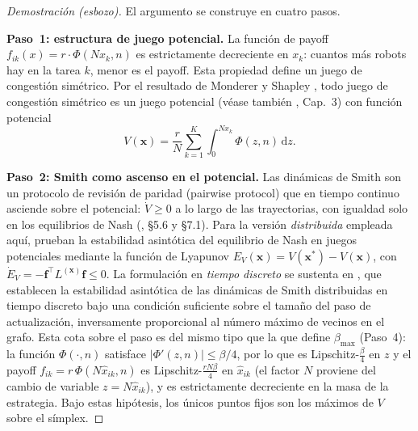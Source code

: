 \begin{proof}[Demostración (esbozo)]
El argumento se construye en cuatro pasos.

\textbf{Paso~1: estructura de juego potencial.}
La función de payoff $f_{ik}(x) = r \cdot \Phi(Nx_k, n)$ es estrictamente
decreciente en $x_k$: cuantos más robots hay en la tarea $k$, menor es el payoff.
Esta propiedad define un juego de congestión simétrico. Por el resultado de
Monderer y Shapley \citep{monderer1996potential}, todo juego de congestión
simétrico es un juego potencial (véase también \citealt{sandholm2010population},
Cap.~3) con función potencial
\[
  V(\mathbf{x}) = \frac{r}{N}\sum_{k=1}^K \int_0^{Nx_k} \Phi(z, n)\,\mathrm{d}z.
\]

\textbf{Paso~2: Smith como ascenso en el potencial.}
Las dinámicas de Smith son un protocolo de revisión de paridad (pairwise protocol)
que en tiempo continuo asciende sobre el potencial: $\dot{V} \geq 0$ a lo largo de
las trayectorias, con igualdad solo en los equilibrios de Nash
(\citealt{sandholm2010population}, \S5.6 y \S7.1). Para la versión \emph{distribuida}
empleada aquí, \citet{barreiro2017distributed} prueban la estabilidad
asintótica del equilibrio de Nash en juegos potenciales mediante la función de
Lyapunov $E_V(\mathbf{x}) = V(\mathbf{x}^*) - V(\mathbf{x})$, con
$\dot{E}_V = -\mathbf{f}^{\top} L^{(\mathbf{x})}\mathbf{f} \leq 0$. La formulación en
\emph{tiempo discreto} se sustenta en \citet{martinez2020formation,
martinezpiazuelo2022tcss}, que establecen la estabilidad asintótica de las dinámicas
de Smith distribuidas en tiempo discreto bajo una condición suficiente sobre el tamaño
del paso de actualización, inversamente proporcional al número máximo de vecinos en el
grafo.
Esta cota sobre el paso
es del mismo tipo que la que define $\beta_{\max}$ (Paso~4): la función $\Phi(\cdot,n)$
satisface $|\Phi'(z,n)| \leq \beta/4$, por lo que es Lipschitz-$\tfrac{\beta}{4}$ en
$z$ y el payoff $f_{ik} = r\,\Phi(N\hat{x}_{ik},n)$ es Lipschitz-$\tfrac{rN\beta}{4}$
en $\hat{x}_{ik}$ (el factor $N$ proviene del cambio de variable $z = N\hat{x}_{ik}$),
y es estrictamente decreciente en la masa de la estrategia. Bajo estas hipótesis,
los únicos puntos fijos son los máximos de $V$ sobre el símplex.


\end{proof}

